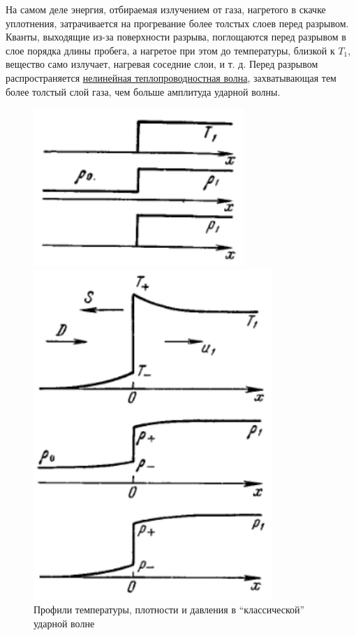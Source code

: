 \documentclass[10pt, a4paper]{article}
\begin{document}
На самом деле энергия, отбираемая излучением от газа, нагретого в скачке уплотнения, затрачивается на прогревание более толстых слоев перед разрывом. Кванты, выходящие из-за поверхности разрыва, поглощаются перед разрывом в слое порядка длины пробега, а нагретое при этом до температуры, близкой к $T_1$, вещество само излучает, нагревая соседние слои, и т. д. Перед разрывом распространяется \uline{нелинейная теплопроводностная волна}, захватывающая тем более толстый слой газа, чем больше амплитуда ударной волны.

\begin{figure}[ht]
	\begin{center}
		\begin{minipage}[ht]{0.32\linewidth}
			\includegraphics[width=1\linewidth]{shock_wave_classic_profiles}
			\caption{Профили температуры, плотности и давления в ``классической'' ударной волне~\cite{zeldovich}}
			\label{fig:shock_wave_classic_profiles} 
		\end{minipage}
		\hfill
		\begin{minipage}[ht]{0.32\linewidth}
			\begin{center}
			\includegraphics[width=0.6\linewidth]{shock_wave_radiation_profiles}

\end{center}
\end{minipage}
\end{center}
\end{figure}
\end{document}
